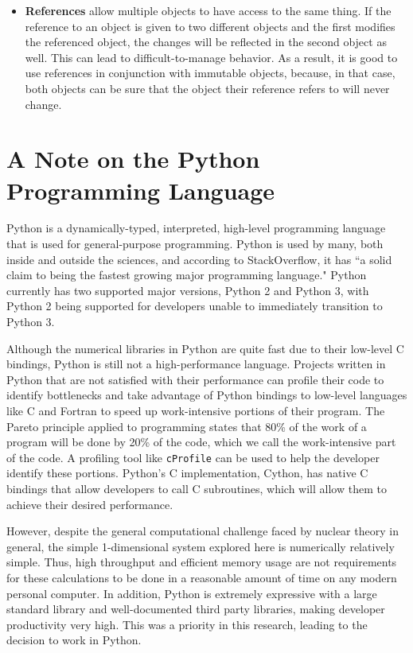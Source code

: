 \begin{itemize}
    \item \textbf{References} allow multiple objects to have access to the same thing. If the reference to an object is given to two different objects and the first modifies the referenced object, the changes will be reflected in the second object as well. This can lead to difficult-to-manage behavior. As a result, it is good to use references in conjunction with immutable objects, because, in that case, both objects can be sure that the object their reference refers to will never change.
\end{itemize}


\section{A Note on the Python Programming Language}

Python is a dynamically-typed, interpreted, high-level programming language that is used for general-purpose programming. Python is used by many, both inside and outside the sciences, and according to StackOverflow, it has ``a solid claim to being the fastest growing major programming language." Python currently has two supported major versions, Python 2 and Python 3, with Python 2 being supported for developers unable to immediately transition to Python 3.

Although the numerical libraries in Python are quite fast due to their low-level C bindings, Python is still not a high-performance language. Projects written in Python that are not satisfied with their performance can profile their code to identify bottlenecks and take advantage of Python bindings to low-level languages like C and Fortran to speed up work-intensive portions of their program. The Pareto principle applied to programming states that 80\% of the work of a program will be done by 20\% of the code, which we call the work-intensive part of the code. A profiling tool like \texttt{cProfile} can be used to help the developer identify these portions. Python's C implementation, Cython, has native C bindings that allow developers to call C subroutines, which will allow them to achieve their desired performance.

However, despite the general computational challenge faced by nuclear theory in general, the simple 1-dimensional system explored here is numerically relatively simple. Thus, high throughput and efficient memory usage are not requirements for these calculations to be done in a reasonable amount of time on any modern personal computer. In addition, Python is extremely expressive with a large standard library and well-documented third party libraries, making developer productivity very high. This was a priority in this research, leading to the decision to work in Python.

